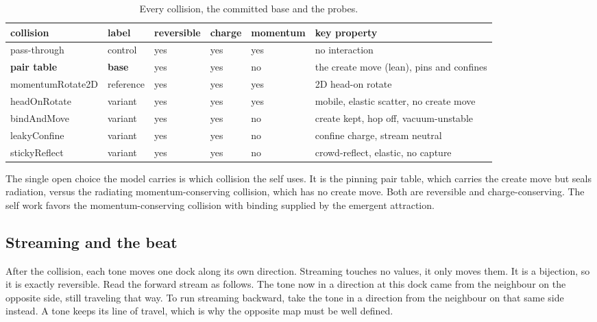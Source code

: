 \begin{table}[ht]
\centering
\begin{tabular}{@{}llllll@{}}
\toprule
collision & label & reversible & charge & momentum & key property \\
\midrule
pass-through & control & yes & yes & yes & no interaction \\
\textbf{pair table} & \textbf{base} & yes & yes & no & the create move (lean), pins and confines \\
momentumRotate2D & reference & yes & yes & yes & 2D head-on rotate \\
headOnRotate & variant & yes & yes & yes & mobile, elastic scatter, no create move \\
bindAndMove & variant & yes & yes & no & create kept, hop off, vacuum-unstable \\
leakyConfine & variant & yes & yes & no & confine charge, stream neutral \\
stickyReflect & variant & yes & yes & no & crowd-reflect, elastic, no capture \\
\bottomrule
\end{tabular}
\caption{Every collision, the committed base and the probes.}
\label{tab:collisions}
\end{table}

\begin{result}
The single open choice the model carries is which collision the self uses. It is the pinning pair table, which carries the create move but seals radiation, versus the radiating momentum-conserving collision, which has no create move. Both are reversible and charge-conserving. The self work favors the momentum-conserving collision with binding supplied by the emergent attraction.
\end{result}

\subsection{Streaming and the beat}

After the collision, each tone moves one dock along its own direction. Streaming touches no values, it only moves them. It is a bijection, so it is exactly reversible. Read the forward stream as follows. The tone now in a direction at this dock came from the neighbour on the opposite side, still traveling that way. To run streaming backward, take the tone in a direction from the neighbour on that same side instead. A tone keeps its line of travel, which is why the opposite map must be well defined.

